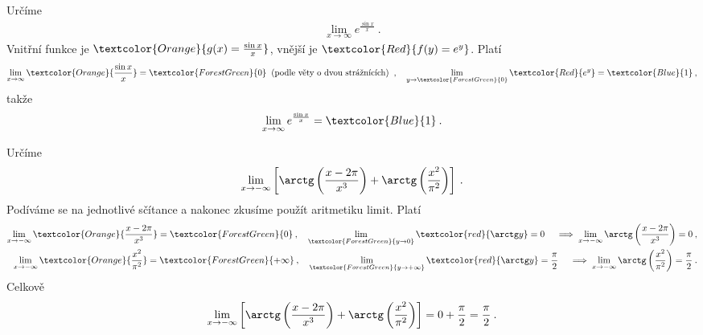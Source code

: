 \begin{example}
    Určíme
    \begin{align}
        \lim_{x \rightarrow \infty} e^{\frac{\sin x}{x}} \:.
    \end{align}
    Vnitřní funkce je $\textcolor{Orange}{g(x) = \frac{\sin x}{x}}$, vnější je $\textcolor{Red}{f(y) = e^y}$. Platí
    \begin{align}
        \lim_{x \rightarrow \infty} \textcolor{Orange}{\frac{\sin x}{x}} = \textcolor{ForestGreen}{0} \: \text{ (podle věty o dvou strážnících) } \:, \quad \lim_{y \rightarrow \textcolor{ForestGreen}{0}} \textcolor{Red}{e^y} = \textcolor{Blue}{1} \:,
    \end{align}
    takže
    \begin{align}
        \lim_{x \rightarrow \infty} e^{\frac{\sin x}{x}} = \textcolor{Blue}{1} \:.
    \end{align}
\end{example}

\begin{example}
    Určíme
    \begin{align}
        \lim_{x \rightarrow -\infty} \left[ \arctg \left( \frac{x-2 \pi}{x^3} \right) + \arctg \left( \frac{x^2}{\pi^2} \right) \right] \:.
    \end{align}
    Podíváme se na jednotlivé sčítance a nakonec zkusíme použít aritmetiku limit.
    Platí \begin{align}
        \lim_{x \rightarrow -\infty} \textcolor{Orange}{\frac{x-2 \pi}{x^3}} = \textcolor{ForestGreen}{0} \:, \quad \lim_{\textcolor{ForestGreen}{y \rightarrow 0}} \textcolor{red}{\arctg y} = 0 \quad \implies \lim_{x \rightarrow -\infty} \arctg \left( \frac{x-2 \pi}{x^3} \right) = 0 \:, \\
        \lim_{x \rightarrow -\infty} \textcolor{Orange}{\frac{x^2}{\pi^2}} = \textcolor{ForestGreen}{+ \infty} \:, \quad \lim_{\textcolor{ForestGreen}{y \rightarrow + \infty}} \textcolor{red}{\arctg y} = \frac{\pi}{2} \quad \implies \lim_{x \rightarrow -\infty} \arctg \left( \frac{x^2}{\pi^2} \right) = \frac{\pi}{2} \:.
    \end{align}
    Celkově
    \begin{align}
        \lim_{x \rightarrow -\infty} \left[ \arctg \left( \frac{x-2 \pi}{x^3} \right) + \arctg \left( \frac{x^2}{\pi^2} \right) \right] = 0 + \frac{\pi}{2} = \frac{\pi}{2} \:.
    \end{align}
\end{example}

